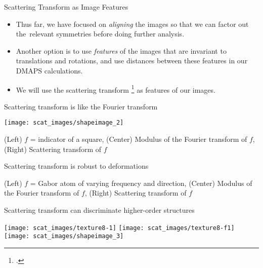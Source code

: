 \begin{frame}{Scattering Transform as Image Features}

{\small 
\begin{itemize}
	\item Thus far, we have focused on {\em aligning} the images so that we can factor out the~relevant symmetries before doing further analysis. 
	\item Another option is to use {\em features} of the images that are invariant to translations and rotations, and use distances between these features in our DMAPS calculations.
	\item 
	We will use the scattering transform \footcite{bruna2012invariant} as features of our images.
\end{itemize}
\par}
\vspace{-0.15in}
\begin{minipage}{0.55\textwidth}
\begin{block}{{\small Scattering transform is like the Fourier transform \par}}
\centering 
\texttt{[image: scat\_images/shapeimage\_2]}\\
{\tiny (Left) $f$ = indicator of a square, (Center) Modulus of the Fourier transform of $f$, (Right) Scattering transform of $f$ \par}
\end{block}

\vspace{-0.1in}
\begin{block}{{\small Scattering transform is robust to deformations \par}}
\centering
{} 

{\tiny (Left) $f$ = Gabor atom of varying frequency and direction, (Center) Modulus of the Fourier transform of $f$, (Right) Scattering transform of $f$ \par}
\end{block}

\end{minipage}
\hfill
\begin{minipage}{0.4\textwidth}
\begin{block}{{\small Scattering transform can discriminate higher-order structures \par}}
\texttt{[image: scat\_images/texture8-1]}
\texttt{[image: scat\_images/texture8-f1]}
\texttt{[image: scat\_images/shapeimage\_3]}


\end{block}
\end{minipage}
\end{frame}
